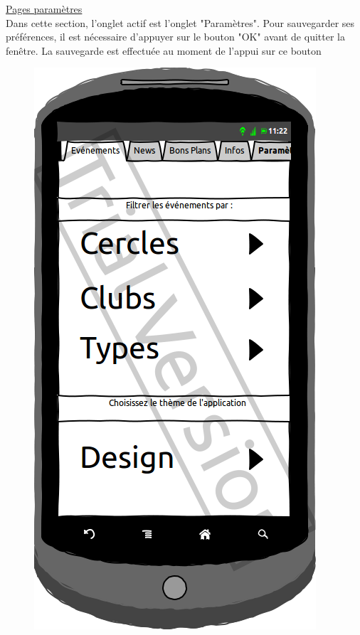 \documentclass[a4paper, 11px]{article}
\begin{document}
\underline{Pages paramètres}\\
Dans cette section, l'onglet actif est l'onglet "Paramètres". 
Pour sauvegarder ses préférences, il est nécessaire d'appuyer sur le bouton "OK" avant de quitter la fenêtre. La sauvegarde est effectuée au moment de l'appui sur ce bouton
\begin{figure}[htbp]
	\begin{minipage}[c]{.33\linewidth}
		\begin{center}
			\includegraphics[scale=0.3]{../../Sketch/Android/Param.png}
		\end{center}
	\end{minipage}
	\hfill
	\begin{minipage}[c]{.33\linewidth}

\end{minipage}
\end{figure}
\end{document}

